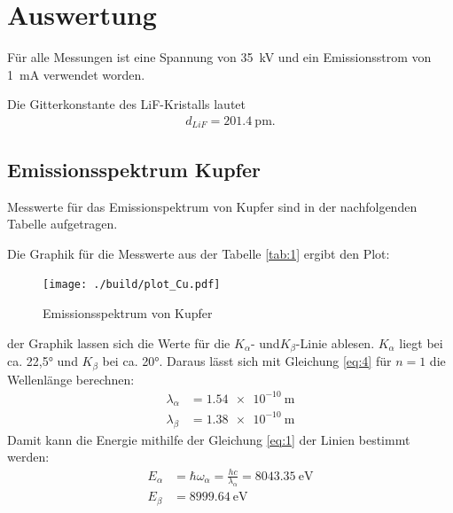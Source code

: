 
\section{Auswertung}

Für alle Messungen ist eine Spannung von \SI{35}{\kilo\volt} und ein
Emissionsstrom von \SI{1}{\milli\ampere} verwendet worden.

Die Gitterkonstante des LiF-Kristalls lautet \cite{V603}
\begin{align}
    d_{LiF}=\SI{201.4}{\pico\meter} \label{eq:5}.
\end{align}

\subsection{Emissionsspektrum Kupfer}

\justifying Messwerte für das Emissionspektrum von Kupfer sind in der nachfolgenden Tabelle 
aufgetragen.







Die Graphik für die Messwerte aus der Tabelle \ref{tab:1} ergibt den Plot:
\begin{figure}[H]
    \centering
    \texttt{[image: ./build/plot\_Cu.pdf]}
    \caption{Emissionsspektrum von Kupfer \cite{matplotlib}}
    \label{fig:3}
\end{figure}

\justifying der Graphik lassen sich die Werte für die $K_{\alpha}$- und$K_{\beta}$-Linie
ablesen. $K_{\alpha}$ liegt bei ca. 22,5° und $K_{\beta}$ bei ca. 20°.
Daraus lässt sich mit Gleichung \eqref{eq:4} für $n=1$ die Wellenlänge berechnen:
\begin{align}
    \lambda _{\alpha}&= \SI{1.54e-10}{\meter} \label{eq:6}\\
    \lambda_{\beta}&= \SI{1.38e-10}{\meter} \label{eq:7}
\end{align}
Damit kann die Energie mithilfe der Gleichung \eqref{eq:1} der Linien bestimmt werden:
\begin{subequations}
\begin{align}
    E_{\alpha}&= \hbar \omega _{\alpha} = \frac{h c}{\lambda _{\alpha}}=\SI{8043.35}{\electronvolt}  \label{eq:8a} \\
    E_{\beta}&= \SI{8999.64}{\electronvolt} \label{eq:8b}
\end{align}
\end{subequations}


